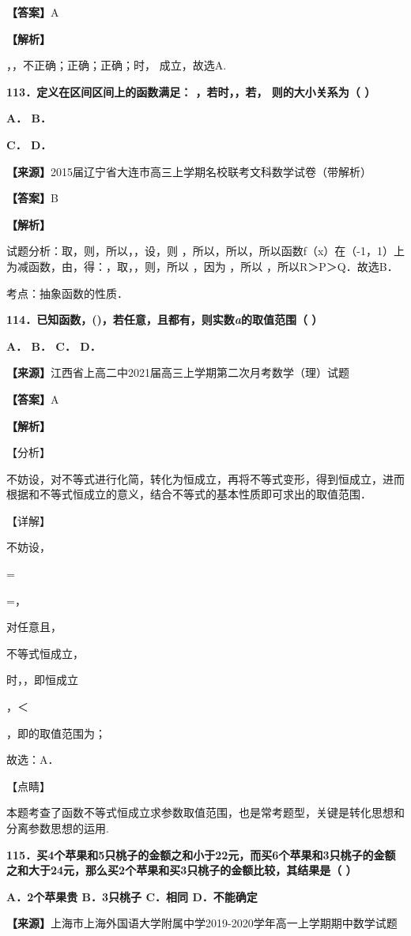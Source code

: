 \documentclass[
]{article}
\begin{document}
\textbf{【答案】}A

\textbf{【解析】}

，，不正确；正确；正确；时， 成立，故选A.

\textbf{113．定义在区间区间上的函数满足： ，若时，，若，
则的大小关系为（ ）}

\textbf{A． B．}

\textbf{C． D．}

\textbf{【来源】}2015届辽宁省大连市高三上学期名校联考文科数学试卷（带解析）

\textbf{【答案】}B

\textbf{【解析】}

试题分析：取，则，所以，，设，则
，所以，所以，所以函数f（x）在（-1，1）上为减函数，由，得：，取，，则，所以
，因为 ，所以 ，所以R＞P＞Q．故选B．

考点：抽象函数的性质．

\textbf{114．已知函数，()，若任意，且都有，则实数\emph{a}的取值范围（
）}

\textbf{A． B． C． D．}

\textbf{【来源】}江西省上高二中2021届高三上学期第二次月考数学（理）试题

\textbf{【答案】}A

\textbf{【解析】}

【分析】

不妨设，对不等式进行化简，转化为恒成立，再将不等式变形，得到恒成立，进而根据和不等式恒成立的意义，结合不等式的基本性质即可求出的取值范围．

【详解】

不妨设，

=

=，

对任意且，

不等式恒成立，

时，，即恒成立

，＜

，即的取值范围为；

故选：A．

【点睛】

本题考查了函数不等式恒成立求参数取值范围，也是常考题型，关键是转化思想和分离参数思想的运用.

\textbf{115．买4个苹果和5只桃子的金额之和小于22元，而买6个苹果和3只桃子的金额之和大于24元，那么买2个苹果和买3只桃子的金额比较，其结果是（
）}

\textbf{A．2个苹果贵 B．3只桃子 C．相同 D．不能确定}

\textbf{【来源】}上海市上海外国语大学附属中学2019-2020学年高一上学期期中数学试题
\end{document}
